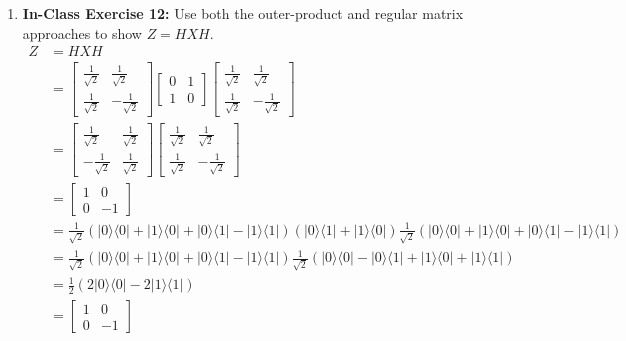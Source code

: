 \documentclass[main.tex]{subfiles}
\begin{document}
\begin{enumerate}
\item[] \textbf{In-Class Exercise 12:} Use both the outer-product and regular matrix approaches to show $Z=H X H$.
    \begin{align*}
        Z   & = H X H \\
            & = \left[\begin{array}{ll} \frac{1}{\sqrt{2}} & \frac{1}{\sqrt{2}} \\ 
            \frac{1}{\sqrt{2}} & -\frac{1}{\sqrt{2}} \end{array}\right]
            \left[\begin{array}{ll} 0 & 1 \\ 1 & 0 \end{array}\right]
            \left[\begin{array}{ll} \frac{1}{\sqrt{2}} & \frac{1}{\sqrt{2}} \\ 
            \frac{1}{\sqrt{2}} & -\frac{1}{\sqrt{2}} \end{array}\right] \\
            & = \left[\begin{array}{ll} \frac{1}{\sqrt{2}} & \frac{1}{\sqrt{2}} \\ 
            -\frac{1}{\sqrt{2}} & \frac{1}{\sqrt{2}} \end{array}\right]
            \left[\begin{array}{ll} \frac{1}{\sqrt{2}} & \frac{1}{\sqrt{2}} \\ 
            \frac{1}{\sqrt{2}} & -\frac{1}{\sqrt{2}} \end{array}\right] \\
            & = \left[\begin{array}{ll} 1 & 0 \\ 0 & -1 \end{array}\right] \\
            & = \frac{1}{\sqrt{2}}(|0\rangle\langle 0|+| 1\rangle\langle 0|+| 0\rangle\langle 1|-| 1\rangle\langle 1|)
            \left(|0\rangle\langle 1|+| 1\rangle\langle 0|\right)
            \frac{1}{\sqrt{2}}(|0\rangle\langle 0|+| 1\rangle\langle 0|+| 0\rangle\langle 1|-| 1\rangle\langle 1|)\\
            & = \frac{1}{\sqrt{2}} (|0\rangle\langle 0|+| 1\rangle\langle 0|+| 0\rangle\langle 1|-| 1\rangle\langle 1|)
            \frac{1}{\sqrt{2}} (|0\rangle\langle 0|-|0\rangle\langle 1|+| 1\rangle\langle 0|+| 1\rangle\langle 1|)\\
            & = \frac{1}{2} (2|0\rangle\langle 0|-2| 1\rangle\langle 1|)\\
            & = \left[\begin{array}{ll} 1 & 0 \\ 0 & -1 \end{array}\right]
    \end{align*}


\end{enumerate}
\end{document}
